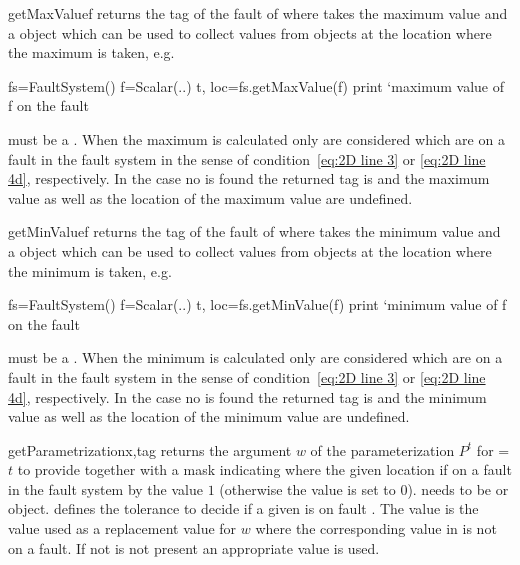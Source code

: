 \begin{methoddesc}[FaultSystem]{getMaxValue}{f}
returns the tag of the fault of where  takes the maximum value and a  object which can be used to collect values from \Data objects at the location where the maximum is taken, e.g.
\begin{python}
fs=FaultSystem()
f=Scalar(..)
t, loc=fs.getMaxValue(f)
print `maximum value of f on the fault %
\end{python}
 must be a \Scalar. When the maximum is calculated only \DataSamplePoints are considered
which are on a fault in the fault system in the sense of condition~\ref{eq:2D line 3} or \ref{eq:2D line 4d}, respectively. In the case no \DataSamplePoints is found the returned tag is  and
the maximum value as well as the location of the maximum value are undefined.
\end{methoddesc}

\begin{methoddesc}[FaultSystem]{getMinValue}{f}
returns the tag of the fault of where  takes the minimum value and a  object which can be used to collect values from \Data objects at the location where the minimum is taken, e.g.
\begin{python}
fs=FaultSystem()
f=Scalar(..)
t, loc=fs.getMinValue(f)
print `minimum value of f on the fault %
\end{python}
 must be a \Scalar. When the minimum is calculated only \DataSamplePoints are considered
which are on a fault in the fault system in the sense of condition~\ref{eq:2D line 3} or \ref{eq:2D line 4d}, respectively. In the case no \DataSamplePoints is found the returned tag is  and
the minimum value as well as the location of the minimum value are undefined.
\end{methoddesc}

\begin{methoddesc}[FaultSystem]{getParametrization}{x,tag }
returns the argument $w$ of the parameterization $P^t$ for =$t$ to provide 
together with a mask indicating where the given location if on a fault in the fault system by the value $1$ (otherwise the value is set to $0$).  needs to be \Vector or \numpyNDA object.  defines the tolerance to decide if a given \DataSamplePoints is on fault . The value
 is the value used as a replacement value for $w$ where the corresponding value in  is not 
on a fault. If not  is not present an appropriate value is used.
\end{methoddesc}
 
